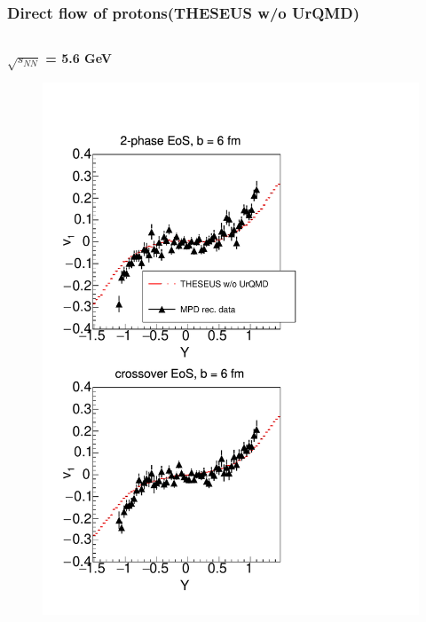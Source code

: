 \documentclass[dvipsnames] {beamer}
\begin{document}
\begin{frame}[shrink=5]
   \frametitle{Direct flow of protons(THESEUS w/o UrQMD)}
   \begin{columns}[c]
     \begin{block}{\bf \centering $\sqrt{s_{NN}}$ = 5.6 GeV}
        \begin{figure}[H]
      \includegraphics[width=1.\textwidth]{energy15AGeV_proton_urqOFF.pdf}
        \end{figure}
     \end{block}
     

\end{columns}
\end{frame}
\end{document}
